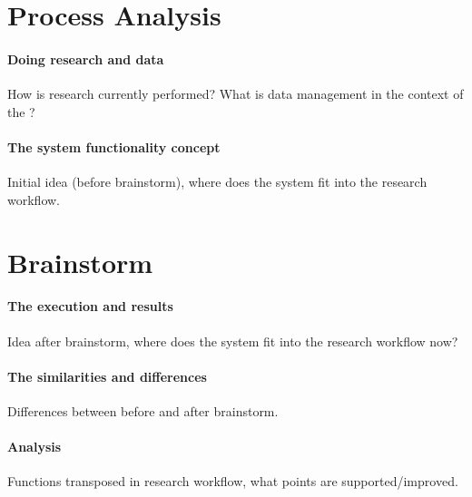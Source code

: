 \section{Process Analysis}
\paragraph{Doing research and \project{} data}
How is research currently performed?
What is data management in the context of the \ivfsystem{}?
\paragraph{The system functionality concept}
Initial idea (before brainstorm), where does the system fit into the research workflow.

\section{Brainstorm}
\paragraph{The execution and results}
Idea after brainstorm, where does the system fit into the research workflow now?
\paragraph{The similarities and differences}
Differences between before and after brainstorm.
\paragraph{Analysis}
Functions transposed in research workflow, what points are supported/improved.